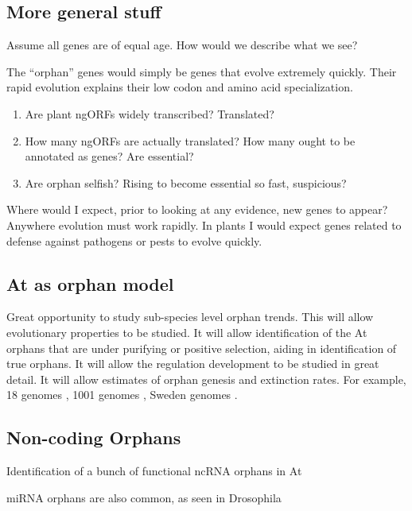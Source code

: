 \subsection{More general stuff}

    Assume all genes are of equal age. How would we describe what we see?

    The ``orphan'' genes would simply be genes that evolve extremely quickly. Their
    rapid evolution explains their low codon and amino acid specialization.

    \begin{enumerate}
        \item Are plant ngORFs widely transcribed? Translated?
        \item How many ngORFs are actually translated? How many ought to be
            annotated as genes? Are essential?
        \item Are orphan selfish? Rising to become essential so fast, suspicious?
    \end{enumerate}

    Where would I expect, prior to looking at any evidence, new genes to appear?
    Anywhere evolution must work rapidly. In plants I would expect genes related to
    defense against pathogens or pests to evolve quickly.
\subsection{At as orphan model}

Great opportunity to study sub-species level orphan trends. This will allow
evolutionary properties to be studied. It will allow identification of the At
orphans that are under purifying or positive selection, aiding in
identification of true orphans. It will allow the regulation development to be
studied in great detail. It will allow estimates of orphan genesis and
extinction rates. For example, 18 genomes \cite{gan_multiple_2011}, 1001
genomes \cite{weigel_1001_2009}, Sweden genomes \cite{long_massive_2013}.

\subsection{Non-coding Orphans}

Identification of a bunch of functional ncRNA orphans in At
\cite{riano-pachon_orphan_2005}

miRNA orphans are also common, as seen in Drosophila \cite{zhang_age-dependent_2010}

